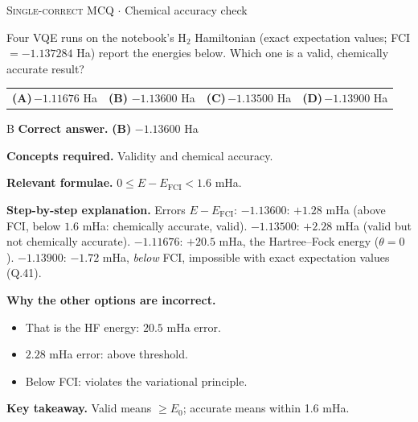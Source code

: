 \documentclass[11pt,a4paper]{article}
\newcommand{\optlabel}[1]{\textbf{(#1)}}
\newcommand{\correctlabel}[1]{\textcolor{okgreen}{\textbf{(#1)}\,\ding{51}}}
\newenvironment{qitem}[1]{\begin{list}{}{\setlength{\leftmargin}{3.3em}\setlength{\labelwidth}{3.1em}%
  \setlength{\labelsep}{0.2em}\setlength{\topsep}{3pt}\setlength{\parsep}{3pt}}\item[\textbf{Q.#1}\hfill]}{\end{list}}
\newcommand{\qsep}{\par\vspace{2pt}{\color{black!15}\hrule}\vspace{4pt}}
\newcommand{\qmeta}[2]{{\footnotesize\color{black!60}\textsc{#1} \;$\cdot$\; #2}\par}
\begin{document}
\begin{qitem}{53}
\qmeta{Single-correct MCQ}{Chemical accuracy check}
Four VQE runs on the notebook's H$_2$ Hamiltonian (exact expectation values; FCI $= -1.137284$ Ha) report the energies below. Which one is a valid,
chemically accurate result?
\par\smallskip\noindent\begin{tabularx}{\linewidth}{@{}*{4}{L}@{}}
\optlabel{A}\,$-1.11676$ Ha & \correctlabel{B}\,$-1.13600$ Ha & \optlabel{C}\,$-1.13500$ Ha & \optlabel{D}\,$-1.13900$ Ha
\end{tabularx}
\end{qitem}
\begin{solbox}{B}
\textbf{\color{brand}Correct answer.} \textcolor{okgreen}{\textbf{(B)}} $-1.13600$ Ha

\textbf{\color{brand}Concepts required.} Validity and chemical accuracy.

\textbf{\color{brand}Relevant formulae.} $0 \le E - E_{\mathrm{FCI}} < 1.6$ mHa.

\textbf{\color{brand}Step-by-step explanation.} Errors $E - E_{\mathrm{FCI}}$: $-1.13600$: $+1.28$ mHa (above FCI, below $1.6$ mHa: chemically accurate, valid).
$-1.13500$: $+2.28$ mHa (valid but not chemically accurate). $-1.11676$: $+20.5$ mHa, the Hartree--Fock energy ($\theta = 0$).
$-1.13900$: $-1.72$ mHa, \emph{below} FCI, impossible with exact expectation values (Q.41).

\textbf{\color{brand}Why the other options are incorrect.}
\begin{itemize}[leftmargin=2.4em, itemsep=1pt, topsep=2pt]
\item[\textbf{(A)}] That is the HF energy: $20.5$ mHa error.
\item[\textbf{(C)}] $2.28$ mHa error: above threshold.
\item[\textbf{(D)}] Below FCI: violates the variational principle.
\end{itemize}
\textbf{\color{brand}Key takeaway.} Valid means $\ge E_0$; accurate means within 1.6 mHa.
\end{solbox}
\qsep
\end{document}
